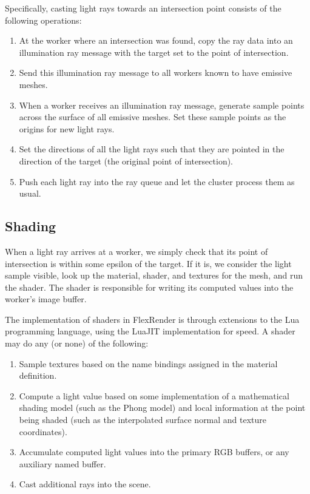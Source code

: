 \documentclass[12pt]{ucthesis}
\begin{document}
Specifically, casting light rays towards an intersection point consists of the
following operations:

\begin{enumerate}
    \item At the worker where an intersection was found, copy the ray data into
        an illumination ray message with the target set to the point of intersection.
    \item Send this illumination ray message to all workers known to have emissive meshes.
    \item When a worker receives an illumination ray message, generate sample points
        across the surface of all emissive meshes. Set these sample points as
        the origins for new light rays.
    \item Set the directions of all the light rays such that they are pointed
        in the direction of the target (the original point of intersection).
    \item Push each light ray into the ray queue and let the cluster process
        them as usual.
\end{enumerate}

\subsection{Shading}
\label{shading}

When a light ray arrives at a worker, we simply check that its point of
intersection is within some epsilon of the target. If it is, we consider the
light sample visible, look up the material, shader, and textures for the mesh,
and run the shader. The shader is responsible for writing its computed values
into the worker's image buffer.

The implementation of shaders in FlexRender is through extensions to the Lua
\cite{lua} programming language, using the LuaJIT \cite{luajit} implementation
for speed. A shader may do any (or none) of the following:

\begin{enumerate}
    \item Sample textures based on the name bindings assigned in the material
        definition.
    \item Compute a light value based on some implementation of a mathematical
        shading model (such as the Phong model) and local information at the
        point being shaded (such as the interpolated surface normal and texture
        coordinates).
    \item Accumulate computed light values into the primary RGB buffers, or
        any auxiliary named buffer.
    \item Cast additional rays into the scene.
\end{enumerate}
\end{document}
